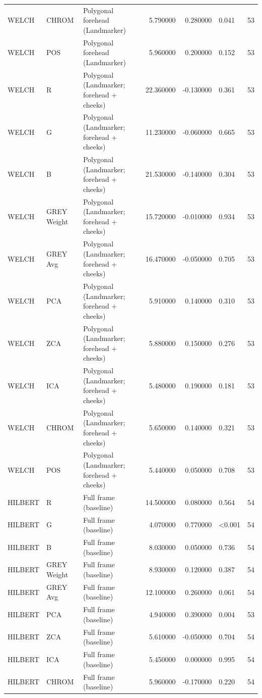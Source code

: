 \begin{table}[htbp]
\begin{tabular}{l l l r r l r}
WELCH & CHROM & Polygonal forehead (Landmarker) & 5.790000 & 0.280000 & 0.041 & 53 \\
WELCH & POS & Polygonal forehead (Landmarker) & 5.960000 & 0.200000 & 0.152 & 53 \\
WELCH & R & Polygonal (Landmarker; forehead + cheeks) & 22.360000 & -0.130000 & 0.361 & 53 \\
WELCH & G & Polygonal (Landmarker; forehead + cheeks) & 11.230000 & -0.060000 & 0.665 & 53 \\
WELCH & B & Polygonal (Landmarker; forehead + cheeks) & 21.530000 & -0.140000 & 0.304 & 53 \\
WELCH & GREY Weight & Polygonal (Landmarker; forehead + cheeks) & 15.720000 & -0.010000 & 0.934 & 53 \\
WELCH & GREY Avg & Polygonal (Landmarker; forehead + cheeks) & 16.470000 & -0.050000 & 0.705 & 53 \\
WELCH & PCA & Polygonal (Landmarker; forehead + cheeks) & 5.910000 & 0.140000 & 0.310 & 53 \\
WELCH & ZCA & Polygonal (Landmarker; forehead + cheeks) & 5.880000 & 0.150000 & 0.276 & 53 \\
WELCH & ICA & Polygonal (Landmarker; forehead + cheeks) & 5.480000 & 0.190000 & 0.181 & 53 \\
WELCH & CHROM & Polygonal (Landmarker; forehead + cheeks) & 5.650000 & 0.140000 & 0.321 & 53 \\
WELCH & POS & Polygonal (Landmarker; forehead + cheeks) & 5.440000 & 0.050000 & 0.708 & 53 \\
HILBERT & R & Full frame (baseline) & 14.500000 & 0.080000 & 0.564 & 54 \\
HILBERT & G & Full frame (baseline) & 4.070000 & 0.770000 & <0.001 & 54 \\
HILBERT & B & Full frame (baseline) & 8.030000 & 0.050000 & 0.736 & 54 \\
HILBERT & GREY Weight & Full frame (baseline) & 8.930000 & 0.120000 & 0.387 & 54 \\
HILBERT & GREY Avg & Full frame (baseline) & 12.100000 & 0.260000 & 0.061 & 54 \\
HILBERT & PCA & Full frame (baseline) & 4.940000 & 0.390000 & 0.004 & 53 \\
HILBERT & ZCA & Full frame (baseline) & 5.610000 & -0.050000 & 0.704 & 54 \\
HILBERT & ICA & Full frame (baseline) & 5.450000 & 0.000000 & 0.995 & 54 \\
HILBERT & CHROM & Full frame (baseline) & 5.960000 & -0.170000 & 0.220 & 54 \\

\end{tabular}
\end{table}

